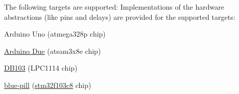 The following targets are supported\+: Implementations of the hardware abstractions (like pins and delays) are provided for the supported targets\+:
\begin{DoxyItemize}
\item Arduino Uno (atmega328p chip)
\item \hyperlink{namespacedue}{Arduino Due} (atsam3x8e chip)
\item \hyperlink{namespacedb103}{D\+B103} (L\+P\+C1114 chip)
\item \hyperlink{namespacestm32f103c8}{blue-\/pill} (\hyperlink{namespacestm32f103c8}{stm32f103c8} chip) 
\end{DoxyItemize}